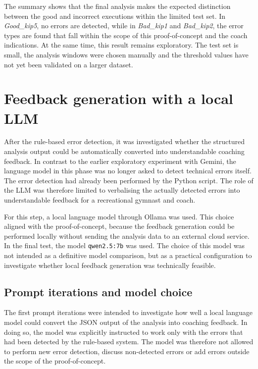The summary shows that the final analysis makes the expected distinction between the good and incorrect executions within the limited test set. In \textit{Good\_kip5}, no errors are detected, while in \textit{Bad\_kip1} and \textit{Bad\_kip2}, the error types are found that fall within the scope of this proof-of-concept and the coach indications. At the same time, this result remains exploratory. The test set is small, the analysis windows were chosen manually and the threshold values have not yet been validated on a larger dataset.

\section{Feedback generation with a local LLM}

After the rule-based error detection, it was investigated whether the structured analysis output could be automatically converted into understandable coaching feedback. In contrast to the earlier exploratory experiment with Gemini, the language model in this phase was no longer asked to detect technical errors itself. The error detection had already been performed by the Python script. The role of the LLM was therefore limited to verbalising the actually detected errors into understandable feedback for a recreational gymnast and coach.

For this step, a local language model through Ollama was used. This choice aligned with the proof-of-concept, because the feedback generation could be performed locally without sending the analysis data to an external cloud service. In the final test, the model \texttt{qwen2.5:7b} was used. The choice of this model was not intended as a definitive model comparison, but as a practical configuration to investigate whether local feedback generation was technically feasible.

\subsection{Prompt iterations and model choice}

The first prompt iterations were intended to investigate how well a local language model could convert the JSON output of the analysis into coaching feedback. In doing so, the model was explicitly instructed to work only with the errors that had been detected by the rule-based system. The model was therefore not allowed to perform new error detection, discuss non-detected errors or add errors outside the scope of the proof-of-concept.

